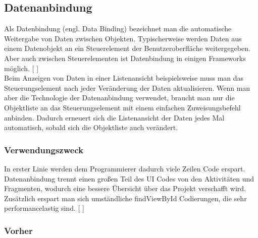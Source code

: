 \documentclass[FIPLY_base.tex]{subfiles}
\begin{document}
\subsection{Datenanbindung}
Als Datenbindung (engl. Data Binding) bezeichnet man die automatische Weitergabe von Daten zwischen Objekten. Typischerweise werden Daten aus einem Datenobjekt an ein Steuerelement der Benutzeroberfläche weitergegeben. Aber auch zwischen Steuerelementen ist Datenbindung in einigen Frameworks möglich. [ \cite{datbdef}]
\ \\
Beim Anzeigen von Daten in einer Listenansicht beispielsweise muss man das Steuerungselement nach jeder Veränderung der Daten aktualisieren. Wenn man aber die Technologie der Datenanbindung verwendet, braucht man nur die Objektliste an das Steuerungselement mit einem einfachen Zuweisungsbefehl anbinden. Dadurch erneuert sich die Listenansicht der Daten jedes Mal automatisch, sobald sich die Objektliste auch verändert.
\ \\
\subsubsection{Verwendungszweck}
In erster Linie werden dem Programmierer dadurch viele Zeilen Code erspart. Datenanbindung trennt einen großen Teil des UI Codes von den Aktivitäten und Fragmenten, wodurch eine bessere Übersicht über das Projekt verschafft wird. Zusätzlich erspart man sich umständliche findViewById Codierungen, die sehr performancelastig sind. [ \cite{datbusing}]
\ \\

\subsubsection{Vorher}
\end{document}
